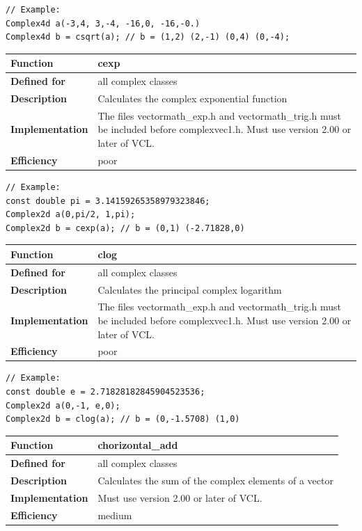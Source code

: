 \documentclass[11pt,a4paper,oneside,openright]{report}
\newcommand{\vspacesmall}{\vspace{3mm}}
\newcommand{\vspacebig}{\vspace{6mm}}
\begin{document}
\begin{lstlisting}[frame=none]
// Example:
Complex4d a(-3,4, 3,-4, -16,0, -16,-0.)
Complex4d b = csqrt(a); // b = (1,2) (2,-1) (0,4) (0,-4);
\end{lstlisting}
\vspacebig


\begin{tabular}{|p{28mm}|p{100mm}|}
\hline
\bfseries Function & cexp \\ \hline
\bfseries Defined for & all complex classes  \\ \hline
\bfseries Description & Calculates the complex exponential function \\ \hline
\bfseries Implementation & The files vectormath\_exp.h and vectormath\_trig.h
must be included before complexvec1.h. Must use version 2.00 or later of VCL. \\ \hline
\bfseries Efficiency & poor \\ \hline
\end{tabular}
\vspacesmall

\begin{lstlisting}[frame=none]
// Example:
const double pi = 3.14159265358979323846;
Complex2d a(0,pi/2, 1,pi);
Complex2d b = cexp(a); // b = (0,1) (-2.71828,0)
\end{lstlisting}
\vspacebig


\begin{tabular}{|p{28mm}|p{100mm}|}
\hline
\bfseries Function & clog \\ \hline
\bfseries Defined for & all complex classes  \\ \hline
\bfseries Description & Calculates the principal complex logarithm \\ \hline
\bfseries Implementation & The files vectormath\_exp.h and vectormath\_trig.h
must be included before complexvec1.h. Must use version 2.00 or later of VCL. \\ \hline
\bfseries Efficiency & poor \\ \hline
\end{tabular}
\vspacesmall

\begin{lstlisting}[frame=none]
// Example:
const double e = 2.71828182845904523536;
Complex2d a(0,-1, e,0);
Complex2d b = clog(a); // b = (0,-1.5708) (1,0)
\end{lstlisting}
\vspacebig


\begin{tabular}{|p{28mm}|p{100mm}|}
\hline
\bfseries Function & chorizontal\_add \\ \hline
\bfseries Defined for & all complex classes  \\ \hline
\bfseries Description & Calculates the sum of the complex elements of a vector \\ \hline
\bfseries Implementation & Must use version 2.00 or later of VCL. \\ \hline
\bfseries Efficiency & medium \\ \hline
\end{tabular}
\vspacesmall
\end{document}
